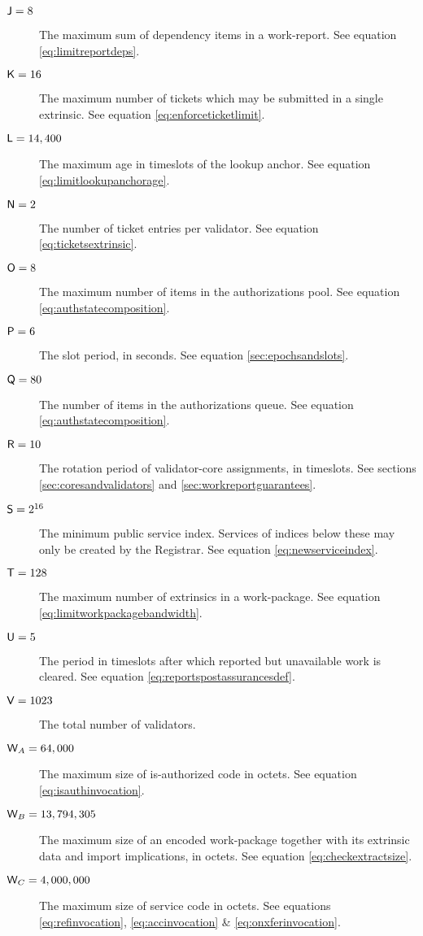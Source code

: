 \begin{description}
  \item[$\mathsf{J} = 8$] The maximum sum of dependency items in a work-report. See equation \ref{eq:limitreportdeps}.
  \item[$\mathsf{K} = 16$] The maximum number of tickets which may be submitted in a single extrinsic. See equation \ref{eq:enforceticketlimit}.
  \item[$\mathsf{L} = 14,400$] The maximum age in timeslots of the lookup anchor. See equation \ref{eq:limitlookupanchorage}.
  \item[$\mathsf{N} = 2$] The number of ticket entries per validator. See equation \ref{eq:ticketsextrinsic}.
  \item[$\mathsf{O} = 8$] The maximum number of items in the authorizations pool. See equation \ref{eq:authstatecomposition}.
  \item[$\mathsf{P} = 6$] The slot period, in seconds. See equation \ref{sec:epochsandslots}.
  \item[$\mathsf{Q} = 80$] The number of items in the authorizations queue. See equation \ref{eq:authstatecomposition}.
  \item[$\mathsf{R} = 10$] The rotation period of validator-core assignments, in timeslots. See sections \ref{sec:coresandvalidators} and \ref{sec:workreportguarantees}.
  \item[$\mathsf{S} = 2^{16}$] The minimum public service index. Services of indices below these may only be created by the Registrar. See equation \ref{eq:newserviceindex}.
  \item[$\mathsf{T} = 128$] The maximum number of extrinsics in a work-package. See equation \ref{eq:limitworkpackagebandwidth}.
  \item[$\mathsf{U} = 5$] The period in timeslots after which reported but unavailable work is cleared. See equation \ref{eq:reportspostassurancesdef}.
  \item[$\mathsf{V} = 1023$] The total number of validators.
  \item[$\mathsf{W}_A = 64,000$] The maximum size of is-authorized code in octets. See equation \ref{eq:isauthinvocation}.
  \item[$\mathsf{W}_B = 13,794,305$] The maximum size of an encoded work-package together with its extrinsic data and import implications, in octets. See equation \ref{eq:checkextractsize}.
  \item[$\mathsf{W}_C = 4,000,000$] The maximum size of service code in octets. See equations \ref{eq:refinvocation}, \ref{eq:accinvocation} \& \ref{eq:onxferinvocation}.

\end{description}
